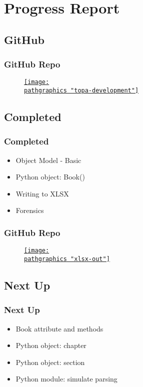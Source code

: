 \section{Progress Report}

\subsection{GitHub}
\begin{frame}
	\frametitle{GitHub Repo}
	\begin{figure}[htbp]
		\begin{center}
			\href{https://github.com/floquet/topa-development}{\texttt{[image: \\pathgraphics "topa-development"]}}
	\label{fig:github t-d}
	\end{center}
	\end{figure}
\end{frame}

\subsection{Completed}
\begin{frame}
	\frametitle{Completed}
		\begin{itemize}
			\item Object Model - Basic
			\item Python object: Book()
			\item Writing to XLSX
			\item Forensics
		\end{itemize}
\end{frame}

\begin{frame}
	\frametitle{GitHub Repo}
	\begin{figure}[htbp]
		\begin{center}
			\href{https://github.com/floquet/topa-development/blob/master/python/xlsx/Amanzi\%20Requirements.xlsx}{\texttt{[image: \\pathgraphics "xlsx-out"]}}
	\label{fig:xl}
	\end{center}
	\end{figure}
\end{frame}

\subsection{Next Up}
\begin{frame}
	\frametitle{Next Up}
		\begin{itemize}
			\item Book attribute and methods
			\item Python object: chapter
			\item Python object: section
			\item Python module: simulate parsing
		\end{itemize}
\end{frame}

